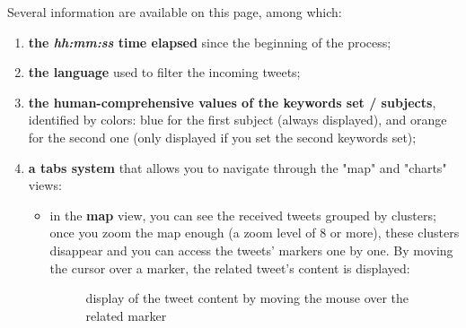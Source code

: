 \documentclass[a4paper,11pt]{report}
\begin{document}
\begin{enumerate}
	Several information are available on this page, among which:
	\begin{enumerate}
		\item \textbf{the \emph{hh:mm:ss} time elapsed} since the beginning of the process;
		\item \textbf{the language} used to filter the incoming tweets;
		\item \textbf{the human-comprehensive values of the keywords set / subjects}, identified by colors: blue for the first subject (always displayed), and orange for the second one (only displayed if you set the second keywords set);
		\item \textbf{a tabs system} that allows you to navigate through the "map" and "charts" views:
			\begin{itemize}
				\item in the \textbf{map} view, you can see the received tweets grouped by clusters; once you zoom the map enough (a zoom level of 8 or more), these clusters disappear and you can access the tweets' markers one by one. By moving the cursor over a marker, the related tweet's content is displayed:
				\begin{figure}[H]
				\vspace{-5pt}
				\begin{center}
				\vspace{-5pt}
				\caption{display of the tweet content by moving the mouse over the related marker}
				\end{center}
				\end{figure}
				\vspace{-10pt}
				

\end{itemize}
\end{enumerate}
\end{enumerate}
\end{document}
